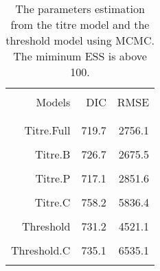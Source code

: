 \documentclass[12pt,a4paper]{article}
\begin{document}
\begin{table}[ht]
\begin{minipage}{\textwidth}     
\centering %
\caption{The parameters estimation from the titre model and the threshold model using MCMC. The miminum ESS is above 100.}
\centering %
\begin{tabular}{rrr}

\hline\hline \\%
   Models     &     DIC	  &     RMSE \\ \\
\hline %
   \\   
   Titre.Full &     719.7 &  	2756.1 \\ \\
    
   Titre.B    &     726.7 &     2675.5 \\ \\

   Titre.P    &     717.1 & 	2851.6 \\ \\
       
   Titre.C    &     758.2 &     5836.4\\ \\       
       
   Threshold  &     731.2 &     4521.1\\ \\
   
   Threshold.C&     735.1 &     6535.1\\ \\

\hline

\end{tabular}
\end{minipage}
\end{table}
\end{document}
